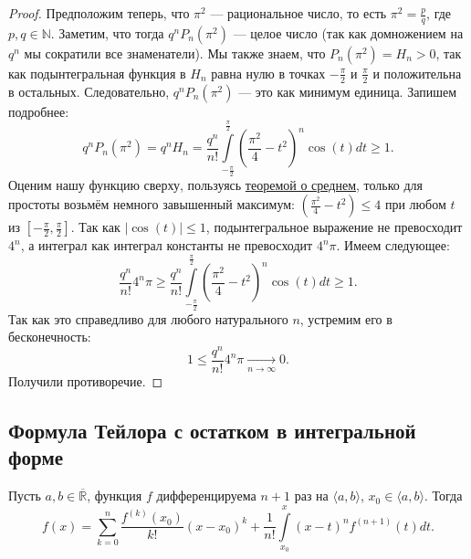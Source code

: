 \begin{proof}
	Предположим теперь, что \(\pi^2\) --- рациональное число, то есть \hbox{\(\pi^2 = \frac{p}{q}\)}, где \(p, q \in \mathbb{N}\). Заметим, что тогда \(q^n P_n(\pi^2)\) --- целое число (так как домножением на \(q^n\) мы сократили все знаменатели). Мы также знаем, что \(P_n(\pi^2) = H_n > 0\), так как подынтегральная функция в \(H_n\) равна нулю в точках \(-\frac\pi2\) и \(\frac\pi2\) и положительна в остальных. Следовательно, \(q^n P_n(\pi^2)\) --- это как минимум единица. Запишем подробнее: \[
		q^n P_n(\pi^2) = q^n H_n = \frac{q^n}{n!} \int\limits_{-\frac\pi2}^{\frac\pi2}
		\left(\frac{\pi^2}4 - t^2 \right)^n \cos(t) dt \geqslant 1.
	\] 
	Оценим нашу функцию сверху, пользуясь \hyperlink{sredneye}{теоремой о среднем}, только для простоты возьмём немного завышенный максимум: \(\left(\frac{\pi^2}4 - t^2 \right) \leqslant 4\) при любом \(t\) из \([-\frac\pi2, \frac\pi2]\). Так как \(|\cos(t)| \leqslant 1\), подынтегральное выражение не превосходит \(4^n\), а интеграл как интеграл константы не превосходит \(4^n \pi\). Имеем следующее: \[
		\frac{q^n}{n!} 4^n \pi \geqslant \frac{q^n}{n!} \int\limits_{-\frac\pi2}^{\frac\pi2}
		\left(\frac{\pi^2}4 - t^2 \right)^n \cos(t) dt \geqslant 1.
	\]
	Так как это справедливо для любого натурального \(n\), устремим его в бесконечность: \[
		1 \leqslant \frac{q^n}{n!} 4^n \pi \xrightarrow[n \to \infty]{} 0.
	\]
	Получили противоречие.
\end{proof}

\subsection{Формула Тейлора с остатком в интегральной форме}

\begin{theorem}
	Пусть \(a, b \in \overline{\mathbb{R}}\), функция \(f\) дифференцируема \(n + 1\) раз на \(\langle a, b \rangle\), \(x_0 \in \langle a, b \rangle\). Тогда \[
		f(x) = \sum_{k = 0}^n \frac{f^{(k)}(x_0)}{k!} (x - x_0)^k +
		\frac{1}{n!} \int\limits_{x_0}^x (x - t)^n f^{(n + 1)}(t) dt.
	\]
\end{theorem}

